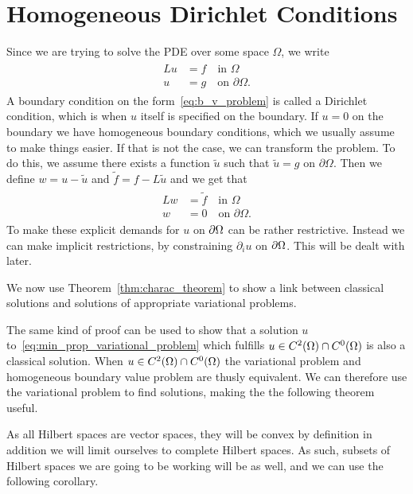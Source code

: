 \section{Homogeneous Dirichlet Conditions}
Since we are trying to solve the PDE over some space $\Omega$, we write
\begin{align}
\begin{split}
    Lu &= f \quad \text{in } \Omega \label{eq:b_v_problem} \\
    u &= g \quad \text{on } \partial \Omega.
\end{split}
\end{align}
A boundary condition on the form~\eqref{eq:b_v_problem} is called a 
Dirichlet condition, which is when $u$ itself is specified on the boundary. 
If $u=0$ on the boundary we have homogeneous boundary conditions, which we usually assume 
to make things easier. If that is not the case, we can
transform the problem. To do this, we assume there exists a function 
$\tilde{u}$ such that $\tilde{u}=g$ on $\partial \Omega$. Then we define 
$w = u - \tilde{u}$ and $\tilde{f}=f-L\tilde{u}$ and we get that
\begin{align}
\begin{split}
    Lw &= \tilde{f} \quad \text{in } \Omega \label{eq:b_v_problem_homogeneous} \\
    w &= 0 \quad \text{on } \partial \Omega. 
\end{split}
\end{align}
To make these explicit demands for $u$ on $\partial \Omega$ can 
be rather restrictive.
Instead we can make implicit restrictions, by constraining 
$\partial _i u$ on $\partial \Omega$.
This will be dealt with later.

We now use Theorem~\ref{thm:charac_theorem} to show a link between classical 
solutions and solutions of appropriate variational problems.

The same kind of proof can be used to show that a solution $u$ to~\eqref{eq:min_prop_variational_problem} which fulfills 
$u\in C^2(\Omega) \cap C^0(\Omega)$ is also a classical solution. 
When $u\in C^2(\Omega) \cap C^0(\Omega)$ the variational problem and 
homogeneous boundary value problem are thusly equivalent.
We can therefore use the variational problem to find solutions, making the
 the following theorem useful.

As all Hilbert spaces are vector spaces, they will be convex by definition in addition we will limit ourselves to complete Hilbert spaces.
As such, subsets of Hilbert spaces we are going to be working will be as well,
and we can use the following corollary.


